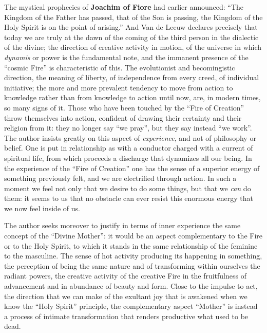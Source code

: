 The mystical prophecies of \textbf{Joachim of Fiore} had earlier announced: ``The Kingdom of the Father has passed, that of the Son is passing, the Kingdom of the Holy Spirit is on the point of arising.'' And Van de Leeuw declares precisely that today we are truly at the dawn of the coming of the third person in the dialectic of the divine; the direction of creative activity in motion, of the universe in which \emph{dynamis} or power is the fundamental note, and the immanent presence of the ``cosmic Fire'' is characteristic of this. The evolutionist and becomingistic direction, the meaning of liberty, of independence from every creed, of individual initiative; the more and more prevalent tendency to move from action to knowledge rather than from knowledge to action until now, are, in modern times, so many signs of it. Those who have been touched by the ``Fire of Creation'' throw themselves into action, confident of drawing their certainty and their religion from it: they no longer say ``we pray'', but they say instead ``we work''. The author insists greatly on this aspect of
\emph{experience}, and not of philosophy or belief. One is put in relationship as with a conductor charged with a current of spiritual life, from which proceeds a discharge that dynamizes all our being. In the experience of the ``Fire of Creation'' one has the sense of a superior energy of something previously felt, and we are electrified through action. In such a moment we feel not only that we desire to do some things, but that we \emph{can} do them: it seems to us that no obstacle can ever resist this enormous energy that we now feel inside of us.

The author seeks moreover to justify in terms of inner experience the same concept of the ``Divine Mother'': it would be an aspect complementary to the Fire or to the Holy Spirit, to which it stands in the same relationship of the feminine to the masculine. The sense of hot activity producing its happening in something, the perception of being the same nature and of transforming within ourselves the radiant powers, the creative activity of the creative Fire in the fruitfulness of advancement and in abundance of beauty and form. Close to the impulse to act, the direction that we can make of the exultant joy that is awakened when we know the ``Holy Spirit'' principle, the complementary aspect ``Mother'' is instead a process of intimate transformation that renders productive what used to be dead.

